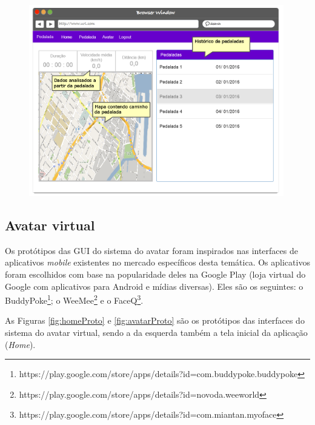 \begin{figure}
\begin{minipage}{1.0\textwidth}
    \centerline{\includegraphics[width=30em]{figuras/Historico.png}}
    \label{fig:recordsProto}
\end{minipage}
\end{figure}

\pagebreak

\subsection{Avatar virtual}
Os protótipos das GUI do sistema do avatar foram inspirados nas interfaces de aplicativos \textit{mobile} existentes no mercado específicos desta temática. Os aplicativos foram escolhidos com base na popularidade deles na Google Play (loja virtual do Google com aplicativos para Android e mídias diversas). Eles são os seguintes: o BuddyPoke\footnote{https://play.google.com/store/apps/details?id=com.buddypoke.buddypoke}; o WeeMee\footnote{https://play.google.com/store/apps/details?id=novoda.weeworld} e o FaceQ\footnote{https://play.google.com/store/apps/details?id=com.miantan.myoface}.
\par
As Figuras \ref{fig:homeProto} e \ref{fig:avatarProto} são os protótipos das interfaces do sistema do avatar virtual, sendo a da esquerda também a tela inicial da aplicação (\textit{Home}).

